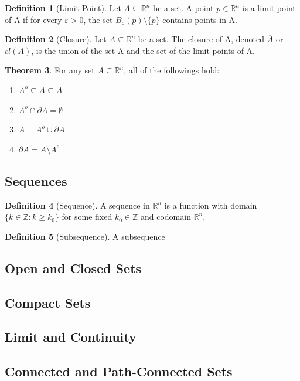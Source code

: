 \documentclass[12pt]{article}
\theoremstyle{definition}
\newtheorem{definition}{Definition}[subsection]
\newtheorem{theorem}[definition]{Theorem}
\theoremstyle{remark}
\begin{document}
\begin{definition}[Limit Point]
Let $A\subseteq\mathbb{R}^n$ be a set. A point $p\in\mathbb{R}^n$ is a limit point of A if for every $\varepsilon > 0$, the set $B_\varepsilon(p) \setminus \{p\}$ contains points in A.
\end{definition}
\begin{definition}[Closure]
Let $A\subseteq\mathbb{R}^n$ be a set. The closure of A, denoted $\overline A$ or $cl(A)$, is the union of the set A and the set of the limit points of A.
\end{definition}
\begin{theorem}
For any set $A\subseteq\mathbb{R}^n$, all of the followings hold:
\begin{enumerate}[label=(\alph*), nosep]
\item $A^o \subseteq A\subseteq \overline A$
\item $A^o\cap \partial A=\emptyset$
\item $\overline A=A^o\cup \partial A$
\item $\partial A=\overline A \setminus A^o$
\end{enumerate}
\end{theorem}

\subsection{Sequences}
\begin{definition}[Sequence]
A sequence in $\mathbb{R}^n$ is a function with domain $\{k\in\mathbb{Z}:k\geq k_0\}$ for some fixed $k_0\in\mathbb{Z}$ and codomain $\mathbb{R}^n$.
\end{definition}
\begin{definition}[Subsequence]
A subsequence 
\end{definition}
\subsection{Open and Closed Sets}
\subsection{Compact Sets}
\subsection{Limit and Continuity}
\subsection{Connected and Path-Connected Sets}
\end{document}
